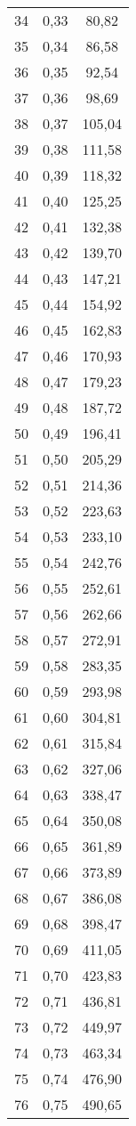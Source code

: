 \documentclass[]{article}
\begin{document}
\begin{longtable}[t]{ccc}
34 & 0,33 & 80,82\\
35 & 0,34 & 86,58\\
36 & 0,35 & 92,54\\
37 & 0,36 & 98,69\\
38 & 0,37 & 105,04\\
39 & 0,38 & 111,58\\
40 & 0,39 & 118,32\\
41 & 0,40 & 125,25\\
42 & 0,41 & 132,38\\
43 & 0,42 & 139,70\\
44 & 0,43 & 147,21\\
45 & 0,44 & 154,92\\
46 & 0,45 & 162,83\\
47 & 0,46 & 170,93\\
48 & 0,47 & 179,23\\
49 & 0,48 & 187,72\\
50 & 0,49 & 196,41\\
51 & 0,50 & 205,29\\
52 & 0,51 & 214,36\\
53 & 0,52 & 223,63\\
54 & 0,53 & 233,10\\
55 & 0,54 & 242,76\\
56 & 0,55 & 252,61\\
57 & 0,56 & 262,66\\
58 & 0,57 & 272,91\\
59 & 0,58 & 283,35\\
60 & 0,59 & 293,98\\
61 & 0,60 & 304,81\\
62 & 0,61 & 315,84\\
63 & 0,62 & 327,06\\
64 & 0,63 & 338,47\\
65 & 0,64 & 350,08\\
66 & 0,65 & 361,89\\
67 & 0,66 & 373,89\\
68 & 0,67 & 386,08\\
69 & 0,68 & 398,47\\
70 & 0,69 & 411,05\\
71 & 0,70 & 423,83\\
72 & 0,71 & 436,81\\
73 & 0,72 & 449,97\\
74 & 0,73 & 463,34\\
75 & 0,74 & 476,90\\
76 & 0,75 & 490,65\\

\end{longtable}
\end{document}
